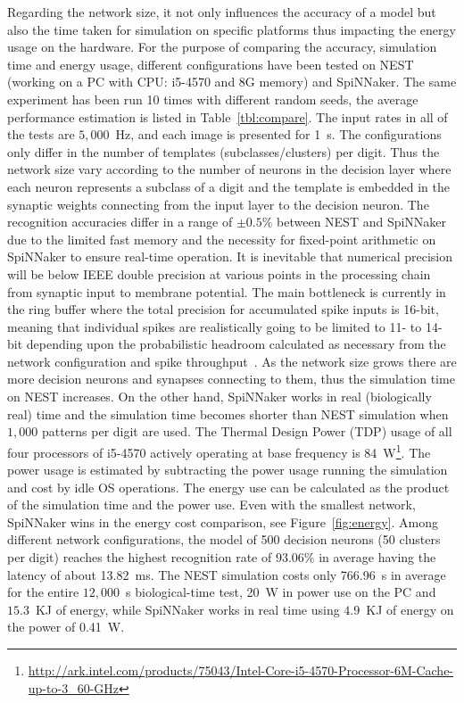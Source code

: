 \documentclass{frontiersENG} %
\begin{document}
Regarding the network size, it not only influences the accuracy of a model but also the time taken for simulation on specific platforms thus impacting the energy usage on the hardware.
For the purpose of comparing the accuracy, simulation time and energy usage, different configurations have been tested on NEST (working on a PC with CPU: i5-4570 and 8G memory) and SpiNNaker.
The same experiment has been run 10 times with different random seeds, the average performance estimation is listed in Table~\ref{tbl:compare}.
The input rates in all of the tests are $5,000$~Hz, and each image is presented for 1~s.
The configurations only differ in the number of templates (subclasses/clusters) per digit.
Thus the network size vary according to the number of neurons in the decision layer where each neuron represents a subclass of a digit and the template is embedded in the synaptic weights connecting from the input layer to the decision neuron.
The recognition accuracies differ in a range of $\pm0.5\%$ between NEST and SpiNNaker due to the limited fast memory and the necessity for fixed-point arithmetic on SpiNNaker to ensure real-time operation.
It is inevitable that numerical precision will be below IEEE double precision at various points in the processing chain from synaptic input to membrane potential.
The main bottleneck is currently in the ring buffer where the total precision for accumulated spike inputs is 16-bit, meaning that individual spikes are realistically going to be limited to 11- to 14-bit depending upon the probabilistic headroom calculated as necessary from the network configuration and spike throughput~\citep{Hopkins2015Accuracy}.
As the network size grows there are more decision neurons and synapses connecting to them, thus the simulation time on NEST increases.
On the other hand, SpiNNaker works in real (biologically real) time and the simulation time becomes shorter than NEST simulation when $1,000$ patterns per digit are used.
The Thermal Design Power (TDP) usage of all four processors of i5-4570 actively operating at base frequency is 84~W\footnote{\url{http://ark.intel.com/products/75043/Intel-Core-i5-4570-Processor-6M-Cache-up-to-3_60-GHz}}.
The power usage is estimated by subtracting the power usage running the simulation and cost by idle OS operations.
The energy use can be calculated as the product of the simulation time and the power use.
Even with the smallest network, SpiNNaker wins in the energy cost comparison, see Figure~\ref{fig:energy}.
Among different network configurations, the model of 500 decision neurons (50 clusters per digit) reaches the highest recognition rate of 93.06\% in average having the latency of about 13.82~ms.
The NEST simulation costs only 766.96~s in average for the entire $12,000$~s biological-time test, 20~W in power use on the PC and $15.3$~KJ of energy, while SpiNNaker works in real time using $4.9$~KJ of energy on the power of 0.41~W.
\end{document}
